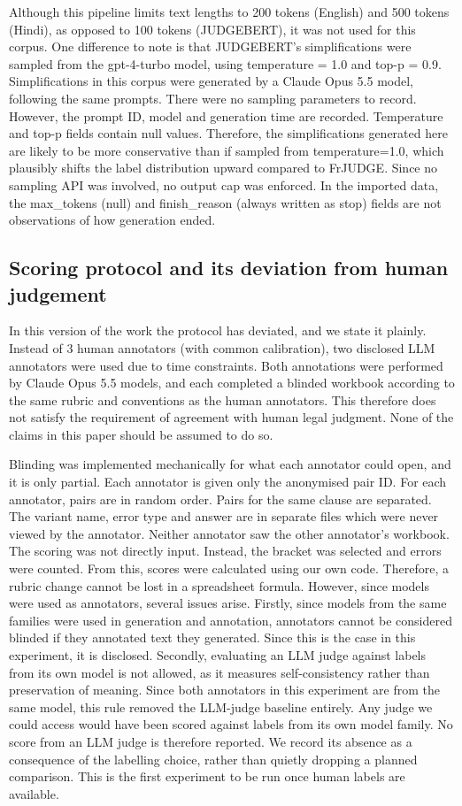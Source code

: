 \documentclass[conference]{IEEEtran}
\begin{document}
Although this pipeline limits text lengths to 200 tokens (English) and 500 tokens (Hindi), as opposed to 100 tokens (JUDGEBERT), it was not used for this corpus. One difference to note is that JUDGEBERT’s simplifications were sampled from the gpt-4-turbo model, using temperature = 1.0 and top-p = 0.9. Simplifications in this corpus were generated by a Claude Opus 5.5 model, following the same prompts. There were no sampling parameters to record. However, the prompt ID, model and generation time are recorded. Temperature and top-p fields contain null values. Therefore, the simplifications generated here are likely to be more conservative than if sampled from temperature=1.0, which plausibly shifts the label distribution upward compared to FrJUDGE. Since no sampling API was involved, no output cap was enforced. In the imported data, the max\_tokens (null) and finish\_reason (always written as stop) fields are not observations of how generation ended.

\subsection{Scoring protocol and its deviation from human judgement}

In this version of the work the protocol has deviated, and we state it plainly. Instead of 3 human annotators (with common calibration), two disclosed LLM annotators were used due to time constraints. Both annotations were performed by Claude Opus 5.5 models, and each completed a blinded workbook according to the same rubric and conventions as the human annotators. This therefore does not satisfy the requirement of agreement with human legal judgment. None of the claims in this paper should be assumed to do so.

Blinding was implemented mechanically for what each annotator could open, and it is only partial. Each annotator is given only the anonymised pair ID. For each annotator, pairs are in random order. Pairs for the same clause are separated. The variant name, error type and answer are in separate files which were never viewed by the annotator. Neither annotator saw the other annotator’s workbook. The scoring was not directly input. Instead, the bracket was selected and errors were counted. From this, scores were calculated using our own code. Therefore, a rubric change cannot be lost in a spreadsheet formula. However, since models were used as annotators, several issues arise. Firstly, since models from the same families were used in generation and annotation, annotators cannot be considered blinded if they annotated text they generated. Since this is the case in this experiment, it is disclosed. Secondly, evaluating an LLM judge against labels from its own model is not allowed, as it measures self-consistency rather than preservation of meaning. Since both annotators in this experiment are from the same model, this rule removed the LLM-judge baseline entirely. Any judge we could access would have been scored against labels from its own model family. No score from an LLM judge is therefore reported. We record its absence as a consequence of the labelling choice, rather than quietly dropping a planned comparison. This is the first experiment to be run once human labels are available.
\end{document}

